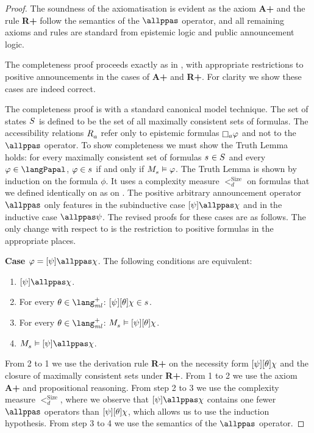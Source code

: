 \begin{proof}
The soundness of the axiomatisation is evident as the axiom {\bf A+} and the rule {\bf R+} follow the semantics of the $\allppas$ operator, and all remaining axioms and rules are standard from epistemic logic and public announcement logic.

The completeness proof proceeds exactly as in \cite{balbianietal.short:2014}, with appropriate restrictions to positive announcements in the cases of {\bf A+} and {\bf R+}.
For clarity we show these cases are indeed correct.

The completeness proof is with a standard canonical model technique.
The set of states $\kStates$ is defined to be the set of all maximally consistent sets of \langPapal{} formulas.
The accessibility relations $\kAccessibility{\agentA}$ refer only to epistemic formulas $\knows[\agentA] \phi$ and not to the $\allppas$ operator.
To show completeness we must show the Truth Lemma holds: for every maximally consistent set of formulas $\kStateS \in \kStates$ and every $\phi \in \langPapal$, $\phi \in \kStateS$ if and only if $\kPModel{\kStateS} \entails \phi$.
The Truth Lemma is shown by induction on the formula $\phi$.
It uses a complexity measure $<^\text{Size}_d$ on formulas that we defined identically on \langPapal{} as on \langApal{}.
The positive arbitrary announcement operator $\allppas$ only features in the subinductive case $\announceA{\psi} \allppas \chi$ and in the inductive case $\allppas \psi$.
The revised proofs for these cases are as follows.
The only change with respect to \cite{balbianietal.short:2014} is the restriction to positive formulas in the appropriate places.

{\bf Case $\phi = \announceA{\psi} \allppas \chi$}.
The following conditions are equivalent:
\begin{enumerate}
    \item $\announceA{\psi} \allppas \chi$.
    \item For every $\theta \in \langMlPlus$: $\announceA{\psi} \announceA{\theta} \chi \in \kStateS$.
    \item For every $\theta \in \langMlPlus$: $\kPModel{\kStateS} \entails \announceA{\psi} \announceA{\theta} \chi$.
    \item $\kPModel{\kStateS} \entails \announceA{\psi} \allppas \chi$.
\end{enumerate}
From 2 to 1 we use the derivation rule {\bf R+} on the necessity form $[ \psi ] [ \theta ] \chi$ and the closure of maximally consistent sets under {\bf R+}. 
From 1 to 2 we use the axiom {\bf A+} and propositional reasoning. 
From step 2 to 3 we use the complexity measure $<^\text{Size}_d$, where we observe that $\announceA{\psi} \allppas \chi$ contains one fewer $\allppas$ operators than $[ \psi ] [ \theta ] \chi$, which allows us to use the induction hypothesis. 
From step 3 to 4 we use the semantics of the $\allppas$ operator.


\end{proof}
